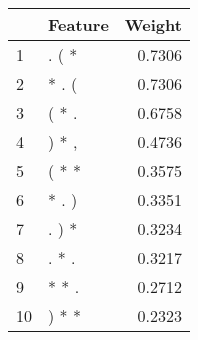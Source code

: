 \begin{tabular}{llr}
\toprule
{} & Feature &  Weight \\
\midrule
1  &   . ( * &  0.7306 \\
2  &   * . ( &  0.7306 \\
3  &   ( * . &  0.6758 \\
4  &   ) * , &  0.4736 \\
5  &   ( * * &  0.3575 \\
6  &   * . ) &  0.3351 \\
7  &   . ) * &  0.3234 \\
8  &   . * . &  0.3217 \\
9  &   * * . &  0.2712 \\
10 &   ) * * &  0.2323 \\
\bottomrule
\end{tabular}
